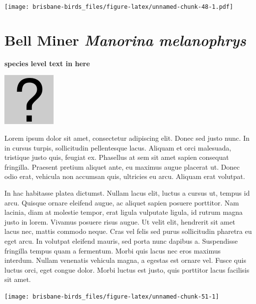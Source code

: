 \documentclass[]{book}
\let\origfigure\figure
\let\endorigfigure\endfigure
\renewenvironment{figure}[1][2] {
  \expandafter\origfigure\expandafter[H]
} {
  \endorigfigure
}
\begin{document}
\begin{figure}
\centering
\texttt{[image: brisbane-birds\_files/figure-latex/unnamed-chunk-48-1.pdf]}
\caption{\label{fig:unnamed-chunk-48}insert figure caption}
\end{figure}

\section{\texorpdfstring{Bell Miner \emph{Manorina
melanophrys}}{Bell Miner Manorina melanophrys}}\label{bell-miner-manorina-melanophrys}

\textbf{species level text in here}

\begin{figure}
\centering
\includegraphics{assets/missing.png}
\caption{No image for species}
\end{figure}

Lorem ipsum dolor sit amet, consectetur adipiscing elit. Donec sed justo
nunc. In in cursus turpis, sollicitudin pellentesque lacus. Aliquam et
orci malesuada, tristique justo quis, feugiat ex. Phasellus at sem sit
amet sapien consequat fringilla. Praesent pretium aliquet ante, eu
maximus augue placerat ut. Donec odio erat, vehicula non accumsan quis,
ultricies eu arcu. Aliquam erat volutpat.

In hac habitasse platea dictumst. Nullam lacus elit, luctus a cursus ut,
tempus id arcu. Quisque ornare eleifend augue, ac aliquet sapien posuere
porttitor. Nam lacinia, diam at molestie tempor, erat ligula vulputate
ligula, id rutrum magna justo in lorem. Vivamus posuere risus augue. Ut
velit elit, hendrerit sit amet lacus nec, mattis commodo neque. Cras vel
felis sed purus sollicitudin pharetra eu eget arcu. In volutpat eleifend
mauris, sed porta nunc dapibus a. Suspendisse fringilla tempus quam a
fermentum. Morbi quis lacus nec eros maximus interdum. Nullam venenatis
vehicula magna, a egestas est ornare vel. Fusce quis luctus orci, eget
congue dolor. Morbi luctus est justo, quis porttitor lacus facilisis sit
amet.

\begin{figure}
\texttt{[image: brisbane-birds\_files/figure-latex/unnamed-chunk-51-1]} \caption{insert figure caption}\label{fig:unnamed-chunk-51}
\end{figure}
\end{document}

